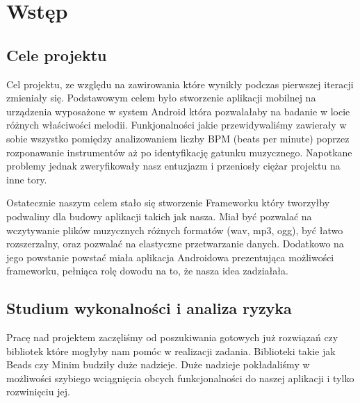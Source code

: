 
\chapter{Wstęp}
\section{Cele projektu}
Cel projektu, ze względu na zawirowania które wynikły podczas pierwszej iteracji zmieniały się. Podstawowym celem było stworzenie aplikacji mobilnej na urządzenia wyposażone w system Android która pozwalałaby na badanie w locie różnych właściwości melodii. Funkjonalności jakie przewidywaliśmy zawierały w sobie wszystko pomiędzy analizowaniem liczby BPM (beats per minute) poprzez rozponawanie instrumentów aż po identyfikację gatunku muzycznego. Napotkane problemy jednak zweryfikowały nasz entuzjazm i przeniosły ciężar projektu na inne tory.

Ostatecznie naszym celem stało się stworzenie Frameworku który tworzyłby podwaliny dla budowy aplikacji takich jak nasza. Miał być pozwalać na wczytywanie plików muzycznych różnych formatów (wav, mp3, ogg), być łatwo rozszerzalny, oraz pozwalać na elastyczne przetwarzanie danych. Dodatkowo na jego powstanie powstać miała aplikacja Androidowa prezentująca możliwości frameworku, pełniąca rolę dowodu na to, że nasza idea zadziałała.
   
\section{Studium wykonalności i analiza ryzyka}
Pracę nad projektem zaczęliśmy od poszukiwania gotowych już rozwiązań czy bibliotek które mogłyby nam pomóc w realizacji zadania. Biblioteki takie jak Beads \cite{Beads} czy Minim \cite{Minim} budziły duże nadzieje. Duże nadzieje pokładaliśmy w możliwości szybiego wciągnięcia obcych funkcjonalności do naszej aplikacji i tylko rozwinięciu jej.

